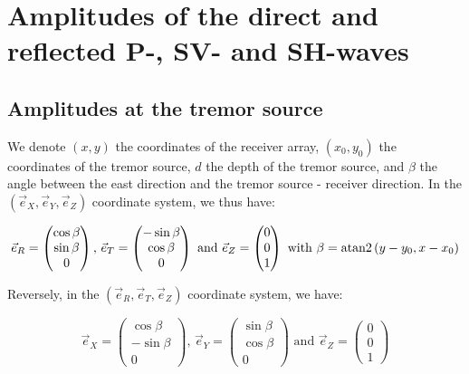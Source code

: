 \documentclass[methods.tex]{subfiles}
\begin{document}
\section{Amplitudes of the direct and reflected P-, SV- and SH-waves}

\subsection{Amplitudes at the tremor source}

We denote $\left( x, y \right)$ the coordinates of the receiver array, $\left( x_0, y_0 \right)$ the coordinates of the tremor source, $d$ the depth of the tremor source, and $\beta$ the angle between the east direction and the tremor source - receiver direction. In the $\left( \vec{e}_X, \vec{e}_Y, \vec{e}_Z \right)$ coordinate system, we thus have:

\begin{equation}
\vec{e}_R = \begin{pmatrix}
\cos \beta \\
\sin \beta \\
0
\end{pmatrix} \text{, } \vec{e}_T = \begin{pmatrix}
- \sin \beta \\
\cos \beta \\
0
\end{pmatrix} \text{ and } \vec{e}_Z = \begin{pmatrix}
0 \\
0 \\
1
\end{pmatrix} \text{ with } \beta = \operatorname{atan2} \left(y - y_0 , x - x_0 \right)
\end{equation}

Reversely, in the $\left( \vec{e}_R, \vec{e}_T, \vec{e}_Z \right)$ coordinate system, we have:

\begin{equation}
\vec{e}_X = \begin{pmatrix}
\cos \beta \\
- \sin \beta \\
0
\end{pmatrix} \text{, } \vec{e}_Y = \begin{pmatrix}
\sin \beta \\
\cos \beta \\
0
\end{pmatrix} \text{ and } \vec{e}_Z = \begin{pmatrix}
0 \\
0 \\
1
\end{pmatrix}
\end{equation}
\end{document}
